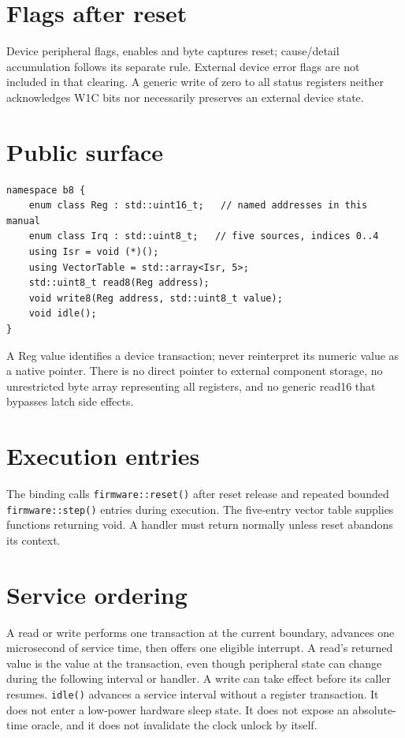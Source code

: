 \documentclass[10pt]{article}
\begin{document}
\section*{Flags after reset}
Device peripheral flags, enables and byte captures reset; cause/detail accumulation follows its separate rule. External device error flags are not included in that clearing. A generic write of zero to all status registers neither acknowledges W1C bits nor necessarily preserves an external device state.

\newpage
{}

\section*{Public surface}
\begin{verbatim}
namespace b8 {
    enum class Reg : std::uint16_t;   // named addresses in this manual
    enum class Irq : std::uint8_t;   // five sources, indices 0..4
    using Isr = void (*)();
    using VectorTable = std::array<Isr, 5>;
    std::uint8_t read8(Reg address);
    void write8(Reg address, std::uint8_t value);
    void idle();
}
\end{verbatim}
A Reg value identifies a device transaction; never reinterpret its numeric value as a native pointer. There is no direct pointer to external component storage, no unrestricted byte array representing all registers, and no generic read16 that bypasses latch side effects.
\section*{Execution entries}
The binding calls \texttt{firmware::reset()} after reset release and repeated bounded \texttt{firmware::step()} entries during execution. The five-entry vector table supplies functions returning void. A handler must return normally unless reset abandons its context.
\section*{Service ordering}
A read or write performs one transaction at the current boundary, advances one microsecond of service time, then offers one eligible interrupt. A read's returned value is the value at the transaction, even though peripheral state can change during the following interval or handler. A write can take effect before its caller resumes.
\texttt{idle()} advances a service interval without a register transaction. It does not enter a low-power hardware sleep state. It does not expose an absolute-time oracle, and it does not invalidate the clock unlock by itself.
\end{document}
